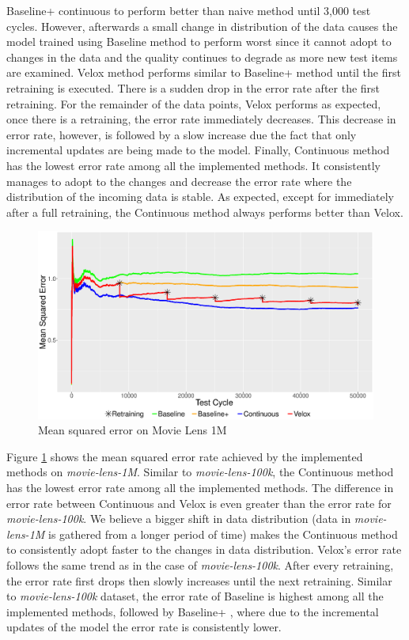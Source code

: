 \documentclass{vldb}
\begin{document}
Baseline+ continuous to perform better than naive method until 3,000 test cycles.
However, afterwards a small change in distribution of the data causes the model trained using Baseline method to perform worst since it cannot adopt to changes in the data and the quality continues to degrade as more new test items are examined.
Velox method performs similar to Baseline+ method until the first retraining is executed.
There is a sudden drop in the error rate after the first retraining.
For the remainder of the data points, Velox performs as expected, once there is a retraining, the error rate immediately decreases.
This decrease in error rate, however, is followed by a slow increase due the fact that only incremental updates are being made to the model.
Finally, Continuous method has the lowest error rate among all the implemented methods.
It consistently manages to adopt to the changes and decrease the error rate where the distribution of the incoming data is stable.
As expected, except for immediately after a full retraining, the Continuous method always performs better than Velox.

\begin{figure}[h]
\centering
\includegraphics[width=\columnwidth]{../images/experiment-results/movie-lens-1m-quality-improved.eps}
\caption{Mean squared error on Movie Lens 1M}
\label{fig:movie-lens-1M-score}
\end{figure}

Figure \ref{fig:movie-lens-1M-score} shows the mean squared error rate achieved by the implemented methods on \textit{movie-lens-1M}.
Similar to \textit{movie-lens-100k}, the Continuous method has the lowest error rate among all the implemented methods.
The difference in error rate between Continuous and Velox is even greater than the error rate for \textit{movie-lens-100k}.
We believe a bigger shift in data distribution (data in \textit{movie-lens-1M} is gathered from a longer period of time) makes the Continuous method to consistently adopt faster to the changes in data distribution.
Velox's error rate follows the same trend as in the case of \textit{movie-lens-100k}. 
After every retraining, the error rate first drops then slowly increases until the next retraining.
Similar to \textit{movie-lens-100k} dataset, the error rate of Baseline is highest among all the implemented methods, followed by Baseline+ , where due to the incremental updates of the model the error rate is consistently lower.
\end{document}
